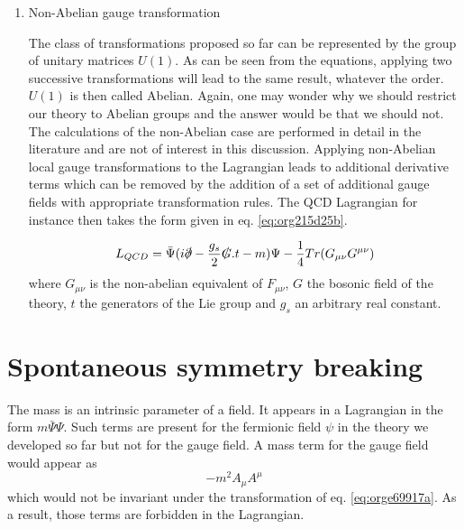 \begin{enumerate}
\item Non-Abelian gauge transformation
\label{sec:orgaf7f151}

The class of transformations proposed so far can be represented by the group of unitary matrices \(U(1)\).
As can be seen from the equations, applying two successive transformations will lead to the same result, whatever the order.
\(U(1)\) is then called Abelian.
Again, one may wonder why we should restrict our theory to Abelian groups and the answer would be that we should not.
The calculations of the non-Abelian case are performed in detail in the literature and are not of interest in this discussion.
Applying non-Abelian local gauge transformations to the Lagrangian leads to additional derivative terms which can be removed by the addition of a set of additional gauge fields with appropriate transformation rules.
The QCD Lagrangian for instance then takes the form given in eq. \ref{eq:org215d25b}.

\begin{equation}
\label{eq:org215d25b}
L_{QCD} = \bar{\Psi}(i\slashed{\partial} - \frac{g_s}{2}\slashed{G}.t -m)\Psi - \frac{1}{4}Tr(G_{\mu\nu}G^{\mu\nu})
\end{equation}
where \(G_{\mu\nu}\) is the non-abelian equivalent of \(F_{\mu\nu}\), \(G\) the bosonic field of the theory, \(t\) the generators of the Lie group and $g_s$ an arbitrary real constant.
\end{enumerate}


\section{Spontaneous symmetry breaking}
\label{sec:orgf6a8fd0}
\label{sec:theory_SymBreak}
The mass is an intrinsic parameter of a field.
It appears in a Lagrangian in the form \(m\bar{\Psi}\Psi\).
Such terms are present for the fermionic field \(\psi\) in the theory we developed so far but not for the gauge field.
A mass term for the gauge field would appear as
\begin{equation}
-m^2A_\mu A^\mu
\end{equation}
which would not be invariant under the transformation of eq. \ref{eq:orge69917a}.
As a result, those terms are forbidden in the Lagrangian.

